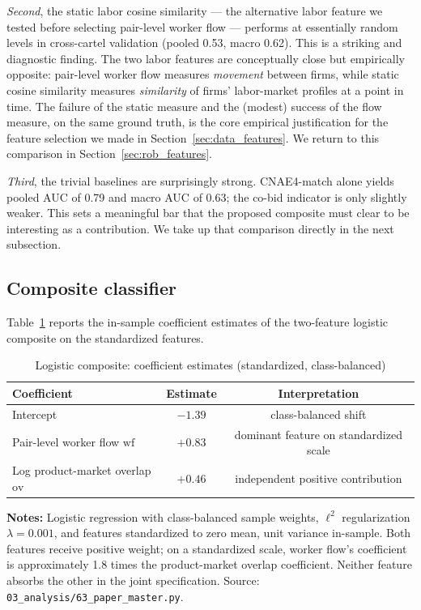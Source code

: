\emph{Second}, the static labor cosine similarity --- the alternative labor feature we tested before selecting pair-level worker flow --- performs at essentially random levels in cross-cartel validation (pooled 0.53, macro 0.62). This is a striking and diagnostic finding. The two labor features are conceptually close but empirically opposite: pair-level worker flow measures \emph{movement} between firms, while static cosine similarity measures \emph{similarity} of firms' labor-market profiles at a point in time. The failure of the static measure and the (modest) success of the flow measure, on the same ground truth, is the core empirical justification for the feature selection we made in Section~\ref{sec:data_features}. We return to this comparison in Section~\ref{sec:rob_features}.

\emph{Third}, the trivial baselines are surprisingly strong. CNAE4-match alone yields pooled AUC of 0.79 and macro AUC of 0.63; the co-bid indicator is only slightly weaker. This sets a meaningful bar that the proposed composite must clear to be interesting as a contribution. We take up that comparison directly in the next subsection.

\subsection{Composite classifier}\label{sec:res_composite}

Table~\ref{tab:composite_coef} reports the in-sample coefficient estimates of the two-feature logistic composite on the standardized features.

\begin{table}[htbp]
\centering
\caption{Logistic composite: coefficient estimates (standardized, class-balanced)}\label{tab:composite_coef}
\small
\begin{tabular}{lcc}
\toprule
Coefficient & Estimate & Interpretation \\
\midrule
Intercept                             & $-1.39$ & class-balanced shift \\
Pair-level worker flow $\mathrm{wf}$  & $+0.83$ & dominant feature on standardized scale\\
Log product-market overlap $\mathrm{ov}$ & $+0.46$ & independent positive contribution \\
\bottomrule
\end{tabular}
\vspace{0.5em}
\begin{minipage}{0.90\textwidth}
\scriptsize{\textbf{Notes:} Logistic regression with class-balanced sample weights, $\ell^2$ regularization $\lambda = 0.001$, and features standardized to zero mean, unit variance in-sample. Both features receive positive weight; on a standardized scale, worker flow's coefficient is approximately 1.8 times the product-market overlap coefficient. Neither feature absorbs the other in the joint specification. Source: \texttt{03\_analysis/63\_paper\_master.py}.\par}
\end{minipage}
\end{table}

